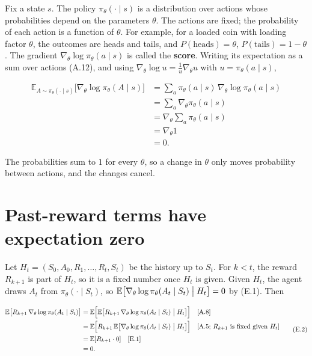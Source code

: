 Fix a state $s$. The policy $\pi_\theta(\cdot\mid s)$ is a distribution over actions whose probabilities depend on the parameters $\theta$. The actions are fixed; the probability of each action is a function of $\theta$. For example, for a loaded coin with loading factor $\theta$, the outcomes are heads and tails, and $P(\text{heads})=\theta$, $P(\text{tails})=1-\theta$. The gradient $\nabla_\theta\log\pi_\theta(a\mid s)$ is called the \textbf{score}. Writing its expectation as a sum over actions (A.12), and using $\nabla_\theta\log u=\frac{1}{u}\nabla_\theta u$ with $u=\pi_\theta(a\mid s)$,

\begin{equation}
\begin{aligned}
\mathbb{E}_{A\sim\pi_\theta(\cdot\mid s)}\bigl[\nabla_\theta\log\pi_\theta(A\mid s)\bigr]
&=
\sum_{a}\pi_\theta(a\mid s)\,\nabla_\theta\log\pi_\theta(a\mid s)
\\
&=
\sum_{a}\nabla_\theta\pi_\theta(a\mid s)
\\
&=
\nabla_\theta\sum_{a}\pi_\theta(a\mid s)
\\
&=
\nabla_\theta 1
\\
&=
0.
\end{aligned}
\tag{E.1}\label{eq:E.1}
\end{equation}

The probabilities sum to $1$ for every $\theta$, so a change in $\theta$ only moves probability between actions, and the changes cancel.

\section{Past-reward terms have expectation zero}

Let $H_t=(S_0,A_0,R_1,\ldots,R_t,S_t)$ be the history up to $S_t$. For $k<t$, the reward $R_{k+1}$ is part of $H_t$, so it is a fixed number once $H_t$ is given. Given $H_t$, the agent draws $A_t$ from $\pi_\theta(\cdot\mid S_t)$, so $\mathbb{E}\bigl[\nabla_\theta\log\pi_\theta(A_t\mid S_t)\bigm|H_t\bigr]=0$ by (E.1). Then

\begin{equation}
\begin{aligned}
\mathbb{E}\bigl[R_{k+1}\,\nabla_\theta\log\pi_\theta(A_t\mid S_t)\bigr]
&=
\mathbb{E}\Bigl[\mathbb{E}\bigl[R_{k+1}\,\nabla_\theta\log\pi_\theta(A_t\mid S_t)\bigm|H_t\bigr]\Bigr]
\quad\text{[A.8]}
\\
&=
\mathbb{E}\Bigl[R_{k+1}\,\mathbb{E}\bigl[\nabla_\theta\log\pi_\theta(A_t\mid S_t)\bigm|H_t\bigr]\Bigr]
\quad\text{[A.5; $R_{k+1}$ is fixed given $H_t$]}
\\
&=
\mathbb{E}[R_{k+1}\cdot 0]
\quad\text{[E.1]}
\\
&=
0.
\end{aligned}
\tag{E.2}\label{eq:E.2}
\end{equation}

